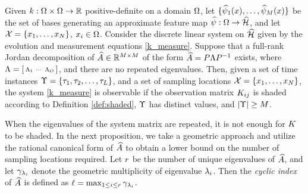 \begin{proposition}\label{prop:1}
Given $k:\Omega\times\Omega\to\mathbb{R}$ positive-definite on a domain $\Omega$, let $\{\widehat{\psi}_1(x), \dots, \widehat{\psi}_{M}(x)\}$ be the set of bases generating an approximate feature map $\widehat{\psi}:\Omega\to\widehat{\mathcal{H}}$, and let
$\mathcal{X} = \{x_1, \dots, x_{N}\}$, $x_i\in\Omega$. Consider the discrete linear system on $\widehat{\mathcal{H}}$ given by the evolution and measurement equations \eqref{k_measure}. Suppose that a full-rank Jordan decomposition of $\widehat{A}\in\mathbb{R}^{M\times M}$ of the form $\widehat{A} = P\Lambda P^{-1}$ exists, where $\Lambda = 
\left[\begin{smallmatrix}\Lambda_1 &\cdots & \Lambda_{O}\end{smallmatrix}\right]$,
and there are no repeated eigenvalues. Then, given a set of time instances  $\Upsilon = \{\tau_1,\tau_2,\dots,\tau_{L}\}$, and a set of sampling locations $\mathcal{X}=\{x_1, \dots, x_{N}\}$,
the system \eqref{k_measure} is observable if the observation matrix $K_{ij}$ is shaded according to Definition \ref{def:shaded},
$\Upsilon$ has distinct values, and $|\Upsilon| \geq M$.
\end{proposition}

When the eigenvalues of the system matrix are repeated, it is not enough for $K$ to be shaded. 
In the next proposition, we take a geometric approach and utilize the rational canonical form  of $\widehat{A}$ to obtain a lower bound on the number of sampling locations required. Let $r$ be the number of unique eigenvalues of $\widehat{A}$, and let $\gamma_{\lambda_i}$ denote the geometric multiplicity of eigenvalue $\lambda_i$. Then the \emph{cyclic index} of $\widehat{A}$ is defined as $\ell = \max_{1\leq i\leq r}{\gamma_{\lambda_i}}$\cite{wonham1974linear}.


